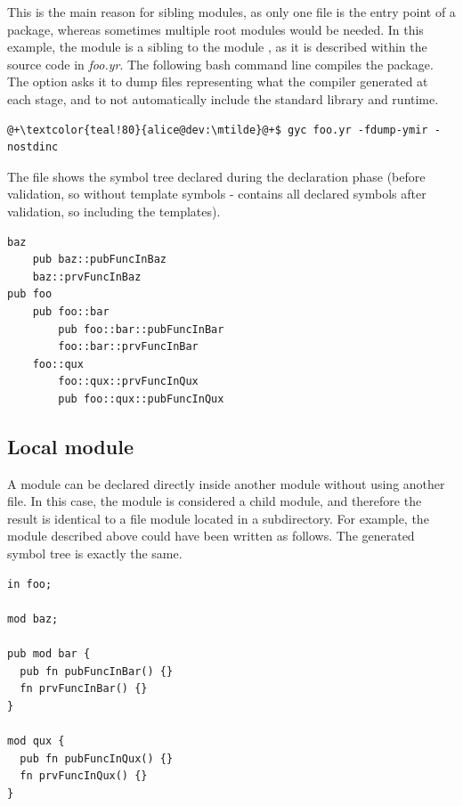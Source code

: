 This is the main reason for sibling modules, as only one file is the entry point
of a package, whereas sometimes multiple root modules would be needed. In this
example, the module  is a sibling to the module , as it is
described within the source code in \textit{foo.yr}. The following bash command
line compiles the package. The  option asks it to
dump files representing what the compiler generated at each stage, and
 to not automatically include the standard library and runtime.

\begin{lstlisting}[style=bashVerb, escapechar=@+]
@+\textcolor{teal!80}{alice@dev:\mtilde}@+$ gyc foo.yr -fdump-ymir -nostdinc
\end{lstlisting}

The file  shows the symbol tree declared during the
declaration phase (before validation, so without template symbols -
 contains all declared symbols after validation, so
including the templates).

\begin{lstlisting}[style=bashVerb, escapechar=@+]
baz
    pub baz::pubFuncInBaz
    baz::prvFuncInBaz
pub foo
    pub foo::bar
        pub foo::bar::pubFuncInBar
        foo::bar::prvFuncInBar
    foo::qux
        foo::qux::prvFuncInQux
        pub foo::qux::pubFuncInQux
\end{lstlisting}

\subsection{Local module}

A module can be declared directly inside another module without using another
file. In this case, the module is considered a child module, and therefore the
result is identical to a file module located in a subdirectory. For example, the
 module described above could have been written as follows. The
generated symbol tree is exactly the same.

\begin{lstlisting}[caption=\textit{./foo.yr}, style=coloredverbatim]
in foo;

mod baz;

pub mod bar {
  pub fn pubFuncInBar() {}
  fn prvFuncInBar() {}
}

mod qux {
  pub fn pubFuncInQux() {}
  fn prvFuncInQux() {}
}
\end{lstlisting}

